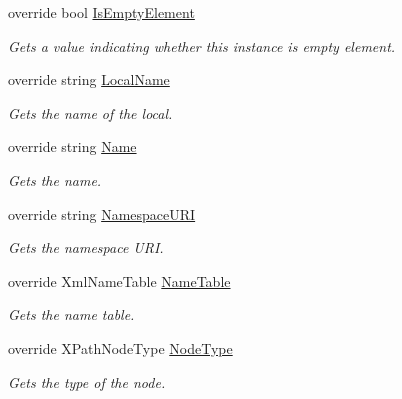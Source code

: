 \begin{DoxyCompactItemize}
override bool \hyperlink{class_html_agility_pack_1_1_html_node_navigator_a76d921c935375e6b46286c8f064e79ae}{Is\+Empty\+Element}
\begin{DoxyCompactList}\small\item\em Gets a value indicating whether this instance is empty element. \end{DoxyCompactList}\item 
override string \hyperlink{class_html_agility_pack_1_1_html_node_navigator_acd22c35f48e8c0bdbe265fd1aee95e62}{Local\+Name}
\begin{DoxyCompactList}\small\item\em Gets the name of the local. \end{DoxyCompactList}\item 
override string \hyperlink{class_html_agility_pack_1_1_html_node_navigator_a6499ab7553f846642947521f65736a25}{Name}
\begin{DoxyCompactList}\small\item\em Gets the name. \end{DoxyCompactList}\item 
override string \hyperlink{class_html_agility_pack_1_1_html_node_navigator_a1f8ee7953643ab1f6bb1239812d22703}{Namespace\+U\+RI}
\begin{DoxyCompactList}\small\item\em Gets the namespace U\+RI. \end{DoxyCompactList}\item 
override Xml\+Name\+Table \hyperlink{class_html_agility_pack_1_1_html_node_navigator_ae34fd99101766a8a3ed5407a4a241d06}{Name\+Table}
\begin{DoxyCompactList}\small\item\em Gets the name table. \end{DoxyCompactList}\item 
override X\+Path\+Node\+Type \hyperlink{class_html_agility_pack_1_1_html_node_navigator_a5225af75b5c3247f74310e99c2ec2d1a}{Node\+Type}
\begin{DoxyCompactList}\small\item\em Gets the type of the node. \end{DoxyCompactList}\item 

\end{DoxyCompactItemize}
